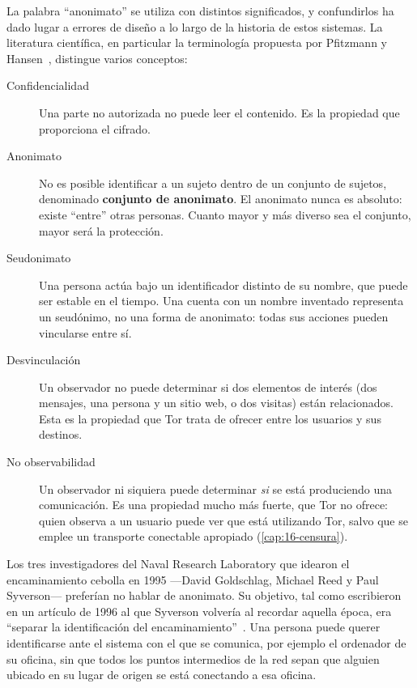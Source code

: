 La palabra \enquote{anonimato} se utiliza con distintos significados, y confundirlos ha dado lugar a errores de diseño a lo largo de la historia de estos sistemas. La literatura científica, en particular la terminología propuesta por Pfitzmann y Hansen~\cite{pfitzmann2010terminology}, distingue varios conceptos:
\begin{description}
  \item[Confidencialidad] Una parte no autorizada no puede leer el contenido. Es la propiedad que proporciona el cifrado.
  \item[Anonimato] No es posible identificar a un sujeto dentro de un conjunto de sujetos, denominado \textbf{conjunto de anonimato}. El anonimato nunca es absoluto: existe \enquote{entre} otras personas. Cuanto mayor y más diverso sea el conjunto, mayor será la protección.
  \item[Seudonimato] Una persona actúa bajo un identificador distinto de su nombre, que puede ser estable en el tiempo. Una cuenta con un nombre inventado representa un seudónimo, no una forma de anonimato: todas sus acciones pueden vincularse entre sí.
  \item[Desvinculación] Un observador no puede determinar si dos elementos de interés (dos mensajes, una persona y un sitio web, o dos visitas) están relacionados. Esta es la propiedad que Tor trata de ofrecer entre los usuarios y sus destinos.
  \item[No observabilidad] Un observador ni siquiera puede determinar \emph{si} se está produciendo una comunicación. Es una propiedad mucho más fuerte, que Tor no ofrece: quien observa a un usuario puede ver que está utilizando Tor, salvo que se emplee un transporte conectable apropiado (\cref{cap:16-censura}).
\end{description}

\begin{storia}
Los tres investigadores del Naval Research Laboratory que idearon el encaminamiento cebolla en 1995 ---David Goldschlag, Michael Reed y Paul Syverson--- preferían no hablar de anonimato. Su objetivo, tal como escribieron en un artículo de 1996 al que Syverson volvería al recordar aquella época, era \enquote{separar la identificación del encaminamiento}~\cite{syverson2011peel}. Una persona puede querer identificarse ante el sistema con el que se comunica, por ejemplo el ordenador de su oficina, sin que todos los puntos intermedios de la red sepan que alguien ubicado en su lugar de origen se está conectando a esa oficina.
\end{storia}

